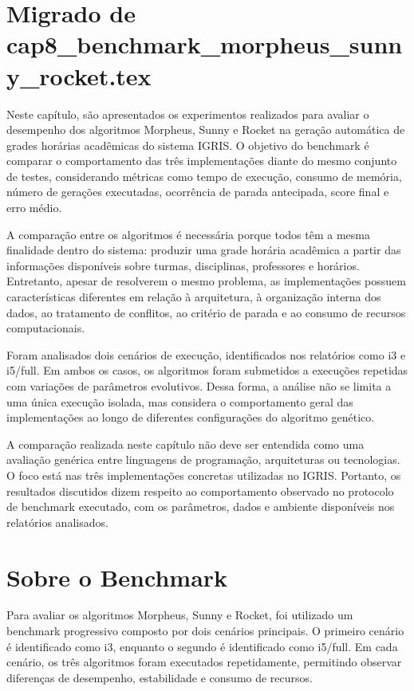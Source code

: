 \setcounter{chapter}{7}
\section{Migrado de cap8\_benchmark\_morpheus\_sunny\_rocket.tex}

Neste capítulo, são apresentados os experimentos realizados para avaliar o desempenho dos algoritmos Morpheus, Sunny e Rocket na geração automática de grades horárias acadêmicas do sistema IGRIS. O objetivo do benchmark é comparar o comportamento das três implementações diante do mesmo conjunto de testes, considerando métricas como tempo de execução, consumo de memória, número de gerações executadas, ocorrência de parada antecipada, score final e erro médio.

A comparação entre os algoritmos é necessária porque todos têm a mesma finalidade dentro do sistema: produzir uma grade horária acadêmica a partir das informações disponíveis sobre turmas, disciplinas, professores e horários. Entretanto, apesar de resolverem o mesmo problema, as implementações possuem características diferentes em relação à arquitetura, à organização interna dos dados, ao tratamento de conflitos, ao critério de parada e ao consumo de recursos computacionais.

Foram analisados dois cenários de execução, identificados nos relatórios como i3 e i5/full. Em ambos os casos, os algoritmos foram submetidos a execuções repetidas com variações de parâmetros evolutivos. Dessa forma, a análise não se limita a uma única execução isolada, mas considera o comportamento geral das implementações ao longo de diferentes configurações do algoritmo genético.

A comparação realizada neste capítulo não deve ser entendida como uma avaliação genérica entre linguagens de programação, arquiteturas ou tecnologias. O foco está nas três implementações concretas utilizadas no IGRIS. Portanto, os resultados discutidos dizem respeito ao comportamento observado no protocolo de benchmark executado, com os parâmetros, dados e ambiente disponíveis nos relatórios analisados.

\section{Sobre o Benchmark}
\label{sec:sobre-o-benchmark}

Para avaliar os algoritmos Morpheus, Sunny e Rocket, foi utilizado um benchmark progressivo composto por dois cenários principais. O primeiro cenário é identificado como i3, enquanto o segundo é identificado como i5/full. Em cada cenário, os três algoritmos foram executados repetidamente, permitindo observar diferenças de desempenho, estabilidade e consumo de recursos.

